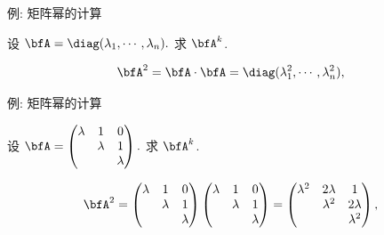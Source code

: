 \begin{frame}{例: 矩阵幂的计算}
	\onslide<+->
	\begin{example}
		设
		$\bfA=\diag(\lambda_1,\cdots,\lambda_n).$
		求 $\bfA^k$.
	\end{example}
	\onslide<+->
	\begin{solution}
		\[\bfA^2=\bfA\cdot\bfA=\diag(\lambda_1^2,\cdots,\lambda_n^2),\]
		\vspace{-\baselineskip}
		\onslide<+->{%
			\[\bfA^3=\bfA\cdot\bfA^2=\diag(\lambda_1^3,\cdots,\lambda_n^3),\]
		}\vspace{-\baselineskip}
	\end{solution}
\end{frame}


\begin{frame}{例: 矩阵幂的计算}\small
\beqskip{0pt}
	\onslide<+->
	\begin{example}
		设 $\bfA=\begin{pmatrix}
			\lambda&1&0\\
			&\lambda&1\\
			&&\lambda
		\end{pmatrix}.$
		求 $\bfA^k$.
	\end{example}
	\onslide<+->
	\begin{solution}
		\[\bfA^2=\begin{pmatrix}
			\lambda&1&0\\
			&\lambda&1\\
			&&\lambda
		\end{pmatrix}\begin{pmatrix}
			\lambda&1&0\\
			&\lambda&1\\
			&&\lambda
		\end{pmatrix}=\begin{pmatrix}
			\lambda^2&2\lambda&1\\
			&\lambda^2&2\lambda\\
			&&\lambda^2
		\end{pmatrix},\]
		\onslide<+->{%
			\[\bfA^3=\begin{pmatrix}
				\lambda&1&0\\
				&\lambda&1\\
				&&\lambda
			\end{pmatrix}\begin{pmatrix}
				\lambda^2&2\lambda&1\\
				&\lambda^2&2\lambda\\

\end{pmatrix}\]}
\end{solution}
\end{frame}
